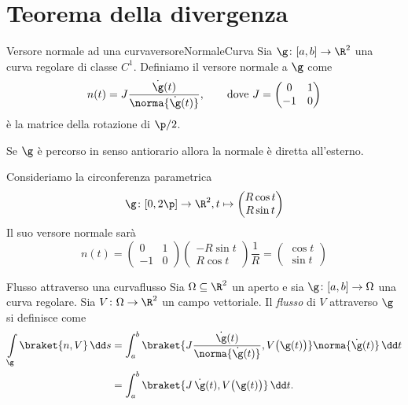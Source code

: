 \section{Teorema della divergenza}

\begin{defn}{Versore normale ad una curva}{versoreNormaleCurva}
	Sia \(\g\colon [a,b] \to \R^2\) una curva regolare di classe \(C^1\).
	Definiamo il versore normale a \(\g\) come
	\[
		n(t) = J \frac{\dot{\g}(t)}{\norma{\dot{\g}(t)}}, \qquad\text{dove } J = 	\begin{pmatrix}
			0  & 1 \\
			-1 & 0
		\end{pmatrix}
	\]
	è la matrice della rotazione di \(\p/2\).
\end{defn}

\begin{oss}
	Se \(\g\) è percorso in senso antiorario allora la normale è diretta all'esterno.
\end{oss}

\begin{ese}
	Consideriamo la circonferenza parametrica
	\[
		\g\colon [0,2\p] \to \R^2, t \mapsto 	\begin{pmatrix}
			R \cos t \\
			R \sin t
		\end{pmatrix}
	\]
	Il suo versore normale sarà
	\[
		n(t) = \begin{pmatrix}0 & 1\\-1 & 0\end{pmatrix} \begin{pmatrix}-R\sin t\\R \cos t\end{pmatrix} \frac{1}{R} = \begin{pmatrix}\cos t\\\sin t\end{pmatrix}
	\]
\end{ese}

\begin{defn}{Flusso attraverso una curva}{flusso}
	Sia \(\Omega \subseteq \R^2\) un aperto e sia \(\g\colon[a,b] \to \Omega\) una curva regolare.
	Sia \(V\colon \Omega \to \R^2\) un campo vettoriale.
	Il \emph{flusso} di \(V\) attraverso \(\g\) si definisce come
	\[
		\begin{split}
			\int\limits_\g \braket{n,V}\,\dd s & = \int_a^b \braket{J \frac{\dot{\g}(t)}{\norma{\dot{\g}(t)}}, V\big(\g(t)\big)}\norma{\dot{\g}(t)}\,\dd t\\
			& = \int_a^b \braket{J\,\dot{\g}(t),V\big(\g(t)\big)}\,\dd t.
		\end{split}
	\]
\end{defn}

